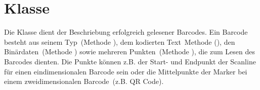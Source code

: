 \section{Klasse }
Die Klasse  dient der Beschriebung erfolgreich gelesener Barcodes.
Ein Barcode besteht aus seinem Typ~(Methode ), dem kodierten Text~Methode (), den Binärdaten~(Methode ) sowie mehreren Punkten~(Methode ), die zum Lesen des Barcodes dienten.
Die Punkte können z.B. der Start- und Endpunkt der Scanline für einen eindimensionalen Barcode sein oder die Mittelpunkte der Marker bei einem zweidimensionalen Barcode~(z.B. QR Code).


